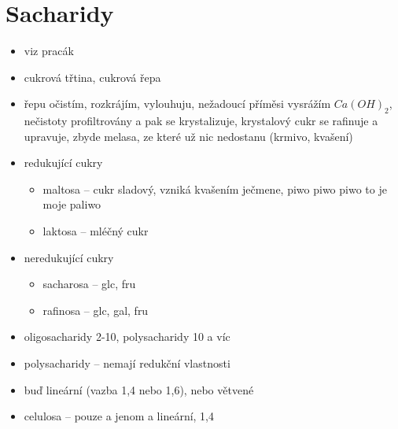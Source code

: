 \documentclass{article}
\begin{document}
\section{Sacharidy}
\begin{itemize}
  \item viz pracák
  \item cukrová třtina, cukrová řepa
  \item řepu očistím, rozkrájím, vylouhuju, nežadoucí příměsi vysrážím $Ca(OH)_2$, nečistoty profiltrovány a pak se krystalizuje, krystalový cukr se rafinuje a upravuje, zbyde melasa, ze které už nic nedostanu (krmivo, kvašení)
  \item redukující cukry
  \begin{itemize}
    \item maltosa -- cukr sladový, vzniká kvašením ječmene, piwo piwo piwo to je moje paliwo
    \item laktosa -- mléčný cukr
  \end{itemize}
  \item neredukující cukry
  \begin{itemize}
    \item sacharosa -- glc, fru
    \item rafinosa -- glc, gal, fru
  \end{itemize}
  \item oligosacharidy 2-10, polysacharidy 10 a víc
  \item polysacharidy -- nemají redukční vlastnosti
  \item buď lineární (vazba 1,4 nebo 1,6), nebo větvené
  \item celulosa -- pouze a jenom a lineární, 1,4
\end{itemize}
\end{document}
